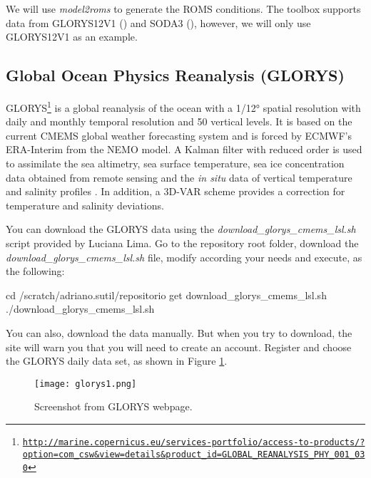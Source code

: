 \noindent We will use \textit{model2roms} to generate the ROMS conditions. The toolbox supports data from GLORYS12V1 (\cite{Fernandez2018}) 
and SODA3 (\cite{Carton2018}), however, we will only use GLORYS12V1 as an example.

\subsection{Global Ocean Physics Reanalysis (GLORYS)}
\bigskip

\noindent GLORYS\textcolor{bleu_cite}{\textit{}\footnote{\textcolor{bleu_cite}{\href{http://marine.copernicus.eu/services-portfolio/access-to-products/?option=com\_csw\&view=details\&product\_id=GLOBAL\_REANALYSIS\_PHY\_001\_030}{\nolinkurl{http://marine.copernicus.eu/services-portfolio/access-to-products/?option=com\_csw\&view=details\&product\_id=GLOBAL\_REANALYSIS\_PHY\_001\_030}}}}}
is a global reanalysis of the ocean with a 1/12° spatial resolution with daily and monthly temporal resolution and 
50 vertical levels. It is based on the current CMEMS global weather forecasting system and is forced by ECMWF's ERA-Interim from the NEMO model.
A Kalman filter with reduced order is used to assimilate the sea altimetry, sea surface temperature, sea ice concentration data obtained 
from remote sensing and the \textit{in situ} data of vertical temperature and salinity profiles .
In addition, a 3D-VAR scheme provides a correction for temperature and salinity deviations.
\bigskip

\noindent You can download the GLORYS data using the \textit{download\_glorys\_cmems\_lsl.sh} script provided by Luciana Lima. Go to the repository root folder, download the \textit{download\_glorys\_cmems\_lsl.sh}
file, modify according your needs and execute, as the following:
\bigskip

\begin{bashcode}
cd /scratch/adriano.sutil/repositorio
get download_glorys_cmems_lsl.sh
./download_glorys_cmems_lsl.sh
\end{bashcode}
\bigskip

\noindent You can also, download the data manually. But when you try to download, the site will warn you that you will need to create an account.
Register and choose the GLORYS daily data set, as shown in Figure \textcolor{bleu_cite}{\ref{glorys1}}.
\bigskip

\begin{figure}[H]
    \centering
    \texttt{[image: glorys1.png]}
    \caption{Screenshot from GLORYS webpage.}
    \label{glorys1}
\end{figure}
\bigskip

